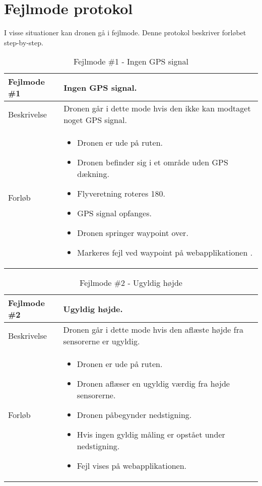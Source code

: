 \chapter{Fejlmode protokol}

I visse situationer kan dronen gå i fejlmode. Denne protokol beskriver forløbet step-by-step.

\begin{table}[H]
\begin{tabular}{| p{3cm}| p{11.5cm}|}
\hline

Fejlmode \#1	 							& Ingen GPS signal. \\\hline
Beskrivelse 									& Dronen går i dette mode hvis den ikke kan modtaget noget GPS signal. \\\hline
Forløb											& \begin{itemize}
															\item Dronen er ude på ruten.
															\item Dronen befinder sig i et område uden GPS dækning.
															\item Flyveretning roteres 180\degree.
															\item GPS signal opfanges.
															\item Dronen springer waypoint over.
															\item Markeres fejl ved waypoint på webapplikationen .
														\end{itemize} \\\hline 
\end{tabular}
\caption{Fejlmode \#1 - Ingen GPS signal}
\label{tab:fejlmode1}
\end{table}

\begin{table}[H]
\begin{tabular}{| p{3cm}| p{11.5cm}|}
\hline

Fejlmode \#2	 							& Ugyldig højde. \\\hline
Beskrivelse 									& Dronen går i dette mode hvis den aflæste højde fra sensorerne er ugyldig. \\\hline
Forløb											& \begin{itemize}
															\item Dronen er ude på ruten.
															\item Dronen aflæser en ugyldig værdig fra højde sensorerne.
															\item Dronen påbegynder nedstigning.
															\item Hvis ingen gyldig måling er opstået under nedstigning.
															\item Fejl vises på webapplikationen.
														\end{itemize} \\\hline 
\end{tabular}
\caption{Fejlmode \#2 - Ugyldig højde}
\label{tab:fejlmode2}
\end{table}

